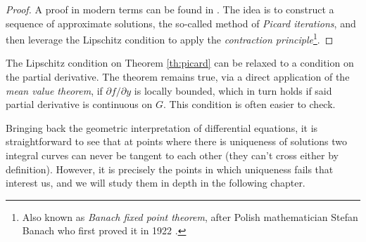 \begin{proof}
  A proof in modern terms can be found in \cite[36]{teschl2012ordinary}. The idea is to construct a sequence of approximate solutions, the so-called method of \textit{Picard iterations}, and then leverage the Lipschitz condition to apply the \textit{contraction principle}\footnote{Also known as \textit{Banach fixed point theorem}, after Polish mathematician Stefan Banach who first proved it in 1922 \cite{banach1922operations}.}.
\end{proof}

\begin{remark}
  The Lipschitz condition on Theorem \ref{th:picard} can be relaxed to a condition on the partial derivative. The theorem remains true, via a direct application of the \textit{mean value theorem}, if $\partial f / \partial y$ is locally bounded, which in turn holds if said partial derivative is continuous on $G$. This condition is often easier to check.
\end{remark}

Bringing back the geometric interpretation of differential equations, it is straightforward to see that at points where there is uniqueness of solutions two integral curves can never be tangent to each other (they can't cross either by definition). However, it is precisely the points in which uniqueness fails that interest us, and we will study them in depth in the following chapter.
